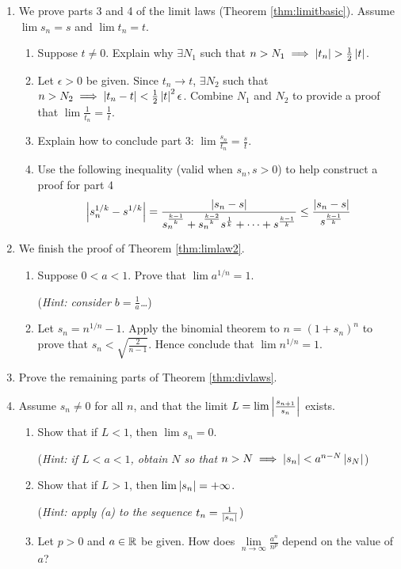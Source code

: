 \begin{exercises}{}{}
\begin{enumerate}
	
		\item\label{exs:limitlawsfinish} We prove parts 3 and 4 of the limit laws (Theorem \ref{thm:limitbasic}). Assume $\lim s_n= s$ and $\lim t_n=t$.
		\begin{enumerate}
		  \item Suppose $t\neq 0$. Explain why $\exists N_1$ such that $n>N_1\implies \nm{t_n}>\frac 12\nm t$.
		  \item Let $\epsilon>0$ be given. Since $t_n\to t$, $\exists N_2$ such that $n>N_2\implies \left| t_n-t\right|<\frac 12\left| t\right|^2\epsilon$. Combine $N_1$ and $N_2$ to provide a proof that $\lim\frac 1{t_n}=\frac 1t$.
		  \item Explain how to conclude part 3: $\lim\frac{s_n}{t_n}=\frac st$.
		  \item Use the following inequality (valid when $s_n,s>0$) to help construct a proof for part 4
			\[\left| s_n^{1/k}-s^{1/k}\right|=\frac{\left| s_n-s\right|}{{s_n^{\frac{k-1}k}+s_n^{\frac{k-2}k}s^{\frac 1k}+\cdots +s^{\frac{k-1}k}}}\le \frac{\left| s_n-s\right|}{s^{\frac{k-1}k}}\]
	 	\end{enumerate}
	
	
			\item\label{exs:nrootlimit}
			We finish the proof of Theorem \ref{thm:limlaw2}.
			\begin{enumerate}
			  \item Suppose $0<a<1$. Prove that $\lim a^{1/n}=1$.\par
				(\emph{Hint: consider $b=\frac 1a$\ldots})
				\item Let $s_n=n^{1/n}-1$. Apply the binomial theorem to $n=(1+s_n)^n$ to prove that $s_n<\sqrt{\frac 2{n-1}}$.
				Hence conclude that $\lim n^{1/n}=1$.
			\end{enumerate}
			
			
			\item Prove the remaining parts of Theorem \ref{thm:divlaws}.
			
			
			\item%
	  	Assume $s_n\neq 0$ for all $n$, and that the limit $L=\lim\smash[b]{\left| \frac{s_{n+1}}{s_n}\right|}$ exists.
	  	\begin{enumerate}
		  	\item Show that if $L<1$, then $\lim s_n=0$.\par
		  	(\emph{Hint: if $L<a<1$, obtain $N$ so that $n>N\implies\left| s_n\right|<a^{n-N}\left| s_N\right|$})
		  	\item Show that if $L>1$, then $\lim\left| s_n\right|=+\infty$.\par
		  	(\emph{Hint: apply (a) to the sequence $t_n=\frac 1{\left| s_n\right|}$})
		  	\item%
		  	Let $p>0$ and $a\in\mathbb{R}$ be given. How does $\lim\limits_{n\to\infty}\frac{a^n}{n^p}$ depend on the value of $a$?
	  \end{enumerate}

	\end{enumerate}
\end{exercises}

